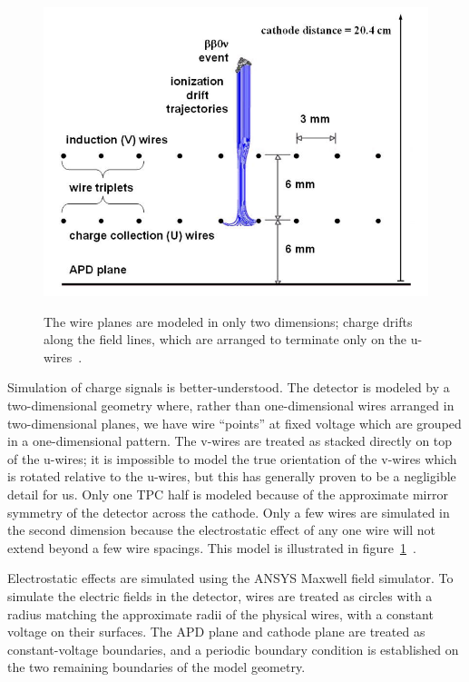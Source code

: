 \begin{figure}
\begin{center}
\includegraphics[keepaspectratio=true,width=\textwidth]{ChargeDrift2DModel.png}
\end{center}
\renewcommand{\baselinestretch}{1}
\small\normalsize
\begin{quote}
\caption{The wire planes are modeled in only two dimensions; charge drifts along the field lines, which are arranged to terminate only on the u-wires~\cite{MCDocumentRun2a}.}
\label{fig:TwoDimensionalWireModel}
\end{quote}
\end{figure}
\renewcommand{\baselinestretch}{2}
\small\normalsize

Simulation of charge signals is better-understood.  The detector is modeled by a two-dimensional geometry where, rather than one-dimensional wires arranged in two-dimensional planes, we have wire ``points'' at fixed voltage which are grouped in a one-dimensional pattern.  The v-wires are treated as stacked directly on top of the u-wires; it is impossible to model the true orientation of the v-wires which is rotated relative to the u-wires, but this has generally proven to be a negligible detail for us.  Only one TPC half is modeled because of the approximate mirror symmetry of the detector across the cathode.  Only a few wires are simulated in the second dimension because the electrostatic effect of any one wire will not extend beyond a few wire spacings.  This model is illustrated in figure~\ref{fig:TwoDimensionalWireModel}~\cite{MCDocumentRun2a}.

Electrostatic effects are simulated using the ANSYS Maxwell field simulator.  To simulate the electric fields in the detector, wires are treated as circles with a radius matching the approximate radii of the physical wires, with a constant voltage on their surfaces.  The APD plane and cathode plane are treated as constant-voltage boundaries, and a periodic boundary condition is established on the two remaining boundaries of the model geometry.

